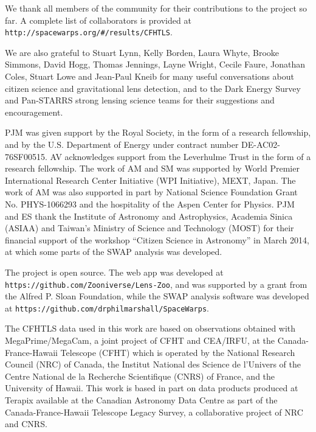 We thank all \Ncollaboration members of the \sw community for their
contributions to the project so far. A complete list of collaborators is
provided at \texttt{http://spacewarps.org/\#/results/CFHTLS}.

We are also grateful to Stuart Lynn, Kelly Borden, Laura Whyte, Brooke Simmons,
David Hogg, Thomas Jennings, Layne  Wright, Cecile Faure, Jonathan Coles, Stuart
Lowe and Jean-Paul Kneib for many useful conversations about citizen science and
gravitational lens detection, and to the Dark Energy Survey and Pan-STARRS strong
lensing science teams for their suggestions and encouragement.

PJM was given support by the Royal Society, in the form of a research
fellowship, and by the U.S. Department of Energy under contract number DE-AC02-76SF00515.
%
AV acknowledges support from the Leverhulme Trust in the form of a research
fellowship.
%
The work of AM and SM was supported by World Premier International Research
Center Initiative (WPI Initiative), MEXT, Japan. The work of AM was also supported in
part by National Science Foundation Grant No. PHYS-1066293 and the hospitality
of the Aspen Center for Physics.
%
%
PJM and ES thank the Institute of Astronomy and Astrophysics, Academia Sinica
(ASIAA) and Taiwan's Ministry of Science and Technology (MOST) for their
financial support of the workshop ``Citizen Science in Astronomy'' in March
2014, at which some parts of the SWAP analysis was developed.

The \sw project is open source.
The web app was developed at \texttt{https://github.com/Zooniverse/Lens-Zoo}, and was supported by a grant from the Alfred P. Sloan Foundation, 
while the SWAP analysis software was developed at
\texttt{https://github.com/drphilmarshall/SpaceWarps}.

The CFHTLS data used in this work are based on observations obtained with
MegaPrime/MegaCam, a joint project of CFHT and CEA/IRFU, at the
Canada-France-Hawaii Telescope (CFHT) which is operated by the National Research
Council (NRC) of Canada, the Institut National des Science de l'Univers of the
Centre National de la Recherche Scientifique (CNRS) of France, and the
University of Hawaii. This work is based in part on data products produced at
Terapix available at the Canadian Astronomy Data Centre as part of the
Canada-France-Hawaii Telescope Legacy Survey, a collaborative project of NRC and
CNRS.
